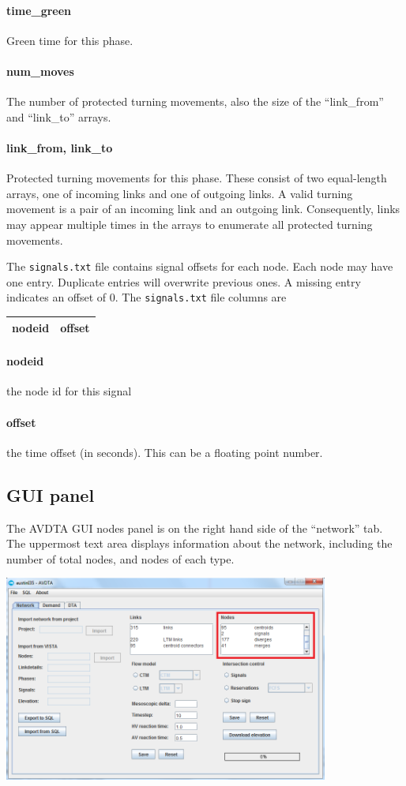 \paragraph*{time\_green} Green time for this phase.
\paragraph*{num\_moves} The number of protected turning movements, also the size of the ``link\_from'' and ``link\_to'' arrays.
\paragraph*{link\_from, link\_to} Protected turning movements for this phase. These consist of two equal-length arrays, one of incoming links and one of outgoing links. A valid turning movement is a pair of an incoming link and an outgoing link. Consequently, links may appear multiple times in the arrays to enumerate all protected turning movements.

The \texttt{signals.txt} file contains signal offsets for each node. Each node may have one entry. Duplicate entries will overwrite previous ones. A missing entry indicates an offset of $0$. The \texttt{signals.txt} file columns are
\begin{center}
\begin{tabular}{cc}
\hline
nodeid & offset\\\hline
\end{tabular}
\end{center}
\paragraph*{nodeid} the node id for this signal
\paragraph*{offset} the time offset (in seconds). This can be a floating point number.


\subsection{GUI panel}

The AVDTA GUI nodes panel is on the right hand side of the ``network'' tab. The uppermost text area displays information about the network, including the number of total nodes, and nodes of each type.
\begin{center}
\includegraphics[width=0.8\textwidth]{images/nodes1.png}
\end{center}

